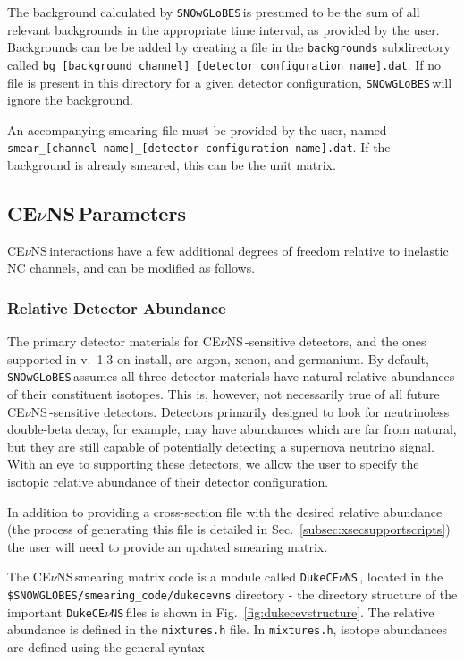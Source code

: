 \documentclass{article}
\newcommand{\cev}{CE$\nu$NS\,}
\newcommand{\snow}{\texttt{SNOwGLoBES}\,}
\newcommand{\dukecev}{\texttt{DukeCE$\nu$NS}\,}
\begin{document}
The background calculated by \snow is presumed to be the sum of all relevant backgrounds in the appropriate time interval, as provided by the user.  Backgrounds can be be added by creating a file in the \texttt{backgrounds} subdirectory called \texttt{bg\_[background channel]\_[detector configuration name].dat}. If no file is present in this directory for a given detector configuration, \snow will ignore the background.

An accompanying smearing file must be provided by the user, named \texttt{smear\_[channel name]\_[detector configuration name].dat}. If the background is already smeared, this can be the unit matrix.

\subsection{\cev Parameters}

\cev interactions have a few additional degrees of freedom relative to inelastic NC channels, and can be modified as follows.

\subsubsection{Relative Detector Abundance} \label{sssec:relabun}

The primary detector materials for \cev-sensitive detectors, and the ones supported in v.~1.3 on install, are argon, xenon, and germanium. By default, \snow assumes all three detector materials have natural relative abundances of their constituent isotopes. This is, however, not necessarily true of all future \cev-sensitive detectors. Detectors primarily designed to look for neutrinoless double-beta decay, for example, may have abundances which are far from natural, but they are still capable of potentially detecting a supernova neutrino signal. With an eye to supporting these detectors, we allow the user to specify the isotopic relative abundance of their detector configuration. 

In addition to providing a cross-section file with the desired relative abundance (the process of generating this file is detailed in Sec.~\ref{subsec:xsecsupportscripts}) the user will need to provide an updated smearing matrix.

The \cev smearing matrix code is a module called \dukecev, located in the\\ \texttt{\$SNOWGLOBES/smearing\_code/dukecevns} directory - the directory structure of the important \dukecev files is shown in Fig.~\ref{fig:dukecevstructure}. The relative abundance is defined in the \texttt{mixtures.h} file. In \texttt{mixtures.h}, isotope abundances are defined using the general syntax
\end{document}
